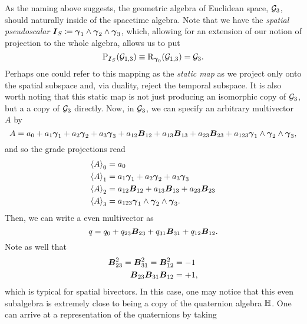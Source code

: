 As the naming above suggests, the geometric algebra of Euclidean space, $\G_3$, should naturally inside of the spacetime algebra. Note that we have the \emph{spatial pseudoscalar} $\blade{I}_S \coloneqq \blade{\gamma}_1 \wedge \blade{\gamma}_2 \wedge \blade{\gamma}_3$, which, allowing for an extension of our notion of projection to the whole algebra, allows us to put
\begin{equation}
\projection_{\blade{I}_S}(\G_{1,3}) \equiv \rejection_{\blade{\gamma}_0} (\G_{1,3}) = \G_3.
\end{equation}
Perhaps one could refer to this mapping as the \emph{static map} as we project only onto the spatial subspace and, via duality, reject the temporal subspace. It is also worth noting that this static map is not just producing an isomorphic copy of $\G_3$, but a a copy of $\G_3$ directly. Now, in $\G_3$, we can specify an arbitrary multivector $A$ by
\begin{equation}
A= a_0 + a_1 \blade{\gamma}_1 + a_2 \blade{\gamma}_2 + a_3 \blade{\gamma}_3 + a_{12} \blade{B}_{12} + a_{13} \blade{B}_{13} + a_{23} \blade{B}_{23} + a_{123} \blade{\gamma}_1 \wedge \blade{\gamma}_2 \wedge \blade{\gamma}_3,
\end{equation}
and so the grade projections read
\begin{subequations}
\begin{align}
\proj{0}{A}&=a_0\\
\proj{1}{A}&=a_1 \blade{\gamma}_1 + a_2 \blade{\gamma}_2 + a_3 \blade{\gamma}_3\\
\proj{2}{A}&=a_{12} \blade{B}_{12} + a_{13} \blade{B}_{13} + a_{23} \blade{B}_{23}\\
\proj{3}{A}&= a_{123} \blade{\gamma}_1 \wedge \blade{\gamma}_2 \wedge \blade{\gamma}_3.
\end{align}
\end{subequations}
Then, we can write a even multivector as
\begin{equation}
q = q_0 + q_{23}\blade{B}_{23} + q_{31} \blade{B}_{31} + q_{12} \blade{B}_{12}.
\end{equation}
Note as well that
\begin{subequations}
\begin{align}
\blade{B}_{23}^2 = \blade{B}_{31}^2 = \blade{B}_{12}^2 &= -1\\
\blade{B}_{23}\blade{B}_{31}\blade{B}_{12} &= +1,
\end{align}
\end{subequations}
which is typical for spatial bivectors. In this case, one may notice that this even subalgebra is extremely close to being a copy of the quaternion algebra $\quat$. One can arrive at a representation of the quaternions by taking
